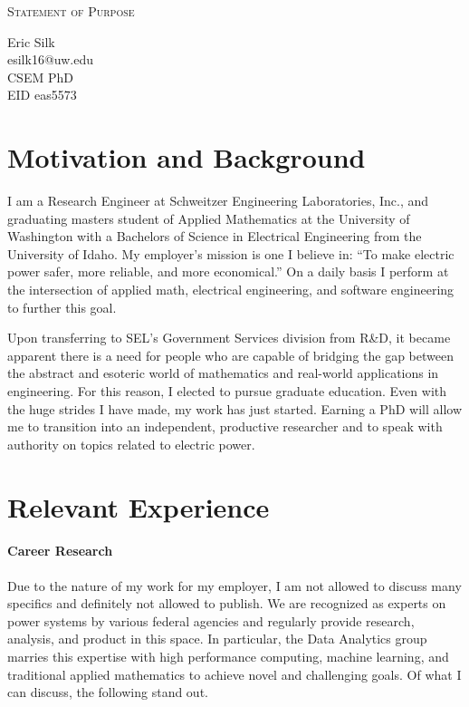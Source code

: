 \documentclass[letterpaper]{article}
\makeatletter
\newcommand{\soptitle}{Statement of Purpose}
\newcommand{\yourname}{Eric Silk}
\newcommand{\youremail}{esilk16@uw.edu}
\makeatother
\begin{document}
\begin{center}{\huge \scshape \soptitle}\end{center}
\begin{center}\vspace{0.2em} {\Large \yourname\\}
  {\youremail\\}{CSEM PhD\\}{EID eas5573}\end{center}
\frenchspacing



\section*{Motivation and Background}
I am a Research Engineer at Schweitzer Engineering Laboratories, Inc., and graduating masters
student of Applied Mathematics at the University of Washington with a Bachelors of Science
in Electrical Engineering from the University of Idaho. My employer's mission is
one I believe in: ``To make electric power safer, more reliable, and more economical.'' On a daily
basis I perform at the intersection of applied math, electrical engineering, and software
engineering to further this goal.

Upon transferring to SEL's Government Services division from R\&D, it became apparent
there is a need for people who are capable of bridging the gap between the abstract
and esoteric world of mathematics and real-world applications in engineering.
For this reason, I elected to pursue graduate education.
Even with the huge strides I have made, my work has just started. Earning a PhD will allow me to
transition into an independent, productive researcher and to speak with authority on topics
related to electric power.

\section*{Relevant Experience}
\paragraph{Career Research}
Due to the nature of my work for my employer, I am not allowed to discuss many specifics
and definitely not allowed to publish. We are recognized as experts
on power systems by various federal agencies and regularly provide research, analysis,
and product in this space. In particular, the Data Analytics group marries this expertise
with high performance computing, machine learning, and traditional applied mathematics to
achieve novel and challenging goals. Of what I can discuss, the following stand out.
\end{document}
